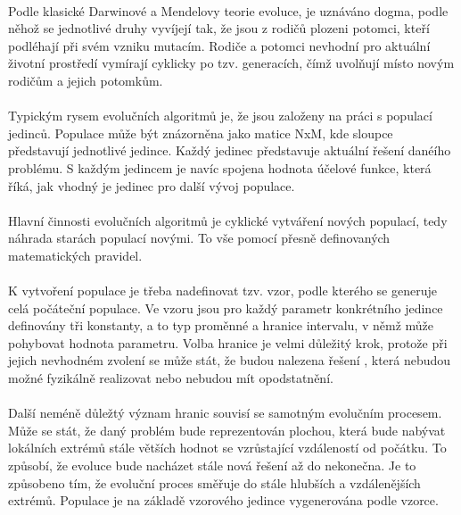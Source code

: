 \documentclass[bc,male,java,dept460]{diploma}		%
\begin{document}
\paragraph*{}
Podle klasické Darwinové a Mendelovy teorie evoluce, je uznáváno dogma, podle něhož se jednotlivé druhy vyvíjejí tak, že jsou z rodičů plozeni potomci, kteří podléhají při svém vzniku mutacím. Rodiče a potomci nevhodní pro aktuální životní prostředí vymírají cyklicky po tzv. generacích, čímž uvolňují místo novým rodičům a jejich potomkům.

\paragraph*{}
Typickým rysem evolučních algoritmů je, že jsou založeny na práci s populací jedinců. Populace může být znázorněna jako matice NxM, kde sloupce představují jednotlivé jedince. Každý jedinec představuje aktuální řešení danéího problému. S každým jedincem je navíc spojena hodnota účelové funkce, která říká, jak vhodný je jedinec pro další vývoj populace.

\paragraph*{}
Hlavní činnosti evolučních algoritmů je cyklické vytváření nových populací, tedy náhrada starách populací novými. To vše pomocí přesně definovaných matematických pravidel.

\paragraph*{}
K vytvoření populace je třeba nadefinovat tzv. vzor, podle kterého se generuje celá počáteční populace. Ve vzoru jsou pro každý parametr konkrétního jedince definovány tři konstanty, a to typ proměnné a hranice intervalu, v němž může pohybovat hodnota parametru. Volba hranice je velmi důležitý krok, protože při jejich nevhodném zvolení se může stát, že budou nalezena řešení , která nebudou možné fyzikálně realizovat nebo nebudou mít opodstatnění. 

\paragraph*{}
Další neméně důležtý význam hranic souvisí se samotným evolučním procesem. Může se stát, že daný problém bude reprezentován plochou, která bude nabývat lokálních extrémů stále větších hodnot se vzrůstající vzdáleností od počátku. To způsobí, že evoluce bude nacházet stále nová řešení až do nekonečna. Je to způsobeno tím, že evoluční proces směřuje do stále hlubších a vzdálenějších extrémů.
Populace je na základě vzorového jedince vygenerována podle vzorce.
\end{document}
